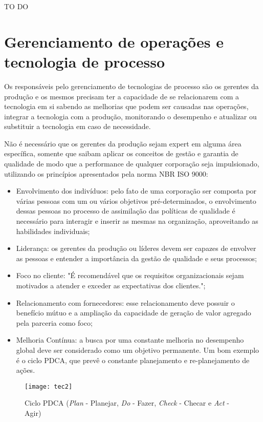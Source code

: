			TO DO

	\section[Gerenciamento de operações e tecnologia de processo]{Gerenciamento de operações e tecnologia de processo}
	\label{sec:tecnologias_Gerenciamento}
		
		Os responsáveis pelo gerenciamento de tecnologias de processo são os gerentes da produção e os mesmos precisam ter a capacidade de se relacionarem com a tecnologia em si sabendo as melhorias que podem ser causadas nas operações, integrar a tecnologia com a produção, monitorando o desempenho e atualizar ou substituir a tecnologia em caso de necessidade.
		
		Não é necessário que os gerentes da produção sejam expert em alguma área específica, somente que saibam aplicar os conceitos de gestão e garantia de qualidade de modo que a performance de qualquer corporação seja impulsionado, utilizando os princípios apresentados pela norma NBR ISO 9000:

		\begin{itemize}
			\item{Envolvimento dos indivíduos: pelo fato de uma corporação ser composta por várias pessoas com um ou vários objetivos pré-determinados, o envolvimento dessas pessoas no processo de assimilação das políticas de qualidade é necessário para interagir e inserir as mesmas na organização, aproveitando as habilidades individuais;}
			\item{Liderança: os gerentes da produção ou líderes devem ser capazes de envolver as pessoas e entender a importância da gestão de qualidade e seus processos;}
			\item{Foco no cliente: "É recomendável que os requisitos organizacionais sejam motivados a atender e exceder as expectativas dos clientes.";}
			\item{Relacionamento com fornecedores: esse relacionamento deve possuir o benefício mútuo e a ampliação da capacidade de geração de valor agregado pela parceria como foco;}
			\item{Melhoria Contínua: a busca por uma constante melhoria no desempenho global deve ser considerado como um objetivo permanente. Um bom exemplo é o ciclo PDCA, que prevê o constante planejamento e re-planejamento de ações.}
		\end{itemize}

		\begin{figure}[h]
			\centering
			\texttt{[image: tec2]}
			\caption[Ciclo PDCA (Plan - Planejar, Do - Fazer, Check - Checar e Act - Agir) ]{Ciclo PDCA (\emph{Plan} - Planejar, \emph{Do} - Fazer, \emph{Check} - Checar e \emph{Act} - Agir) }
			\label{fig:cicloPDCA}
		\end{figure}

